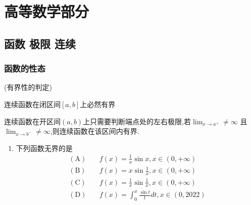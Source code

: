 \documentclass[12pt, a4paper, oneside, UTF8]{ctexbook}
\begin{document}

\else
\fi

\chapter{高等数学部分}

\section{函数 极限 连续}
\subsection{函数的性态}
\begin{remark}(有界性的判定)
    \item 连续函数在闭区间$[a,b]$上必然有界 

    \item 连续函数在开区间$(a,b)$上只需要判断端点处的左右极限,若$\lim_{x\to a^{+}}\neq \infty$ 且
    $\lim_{x\to b^{-}}\neq \infty$,则连续函数在该区间内有界.
\end{remark}

\begin{enumerate}[label=\arabic*.]
    \item  下列函数无界的是
    \begin{align*}
        (\text{A})&\quad f(x)=\frac{1}{x}\sin x, x\in(0,+\infty) \\
        (\text{B})&\quad f(x)=x\sin\frac{1}{x}, x\in(0,+\infty) \\
        (\text{C})&\quad f(x)=\frac{1}{x}\sin\frac{1}{x}, x\in(0,+\infty) \\
        (\text{D})&\quad f(x)=\int_0^x\frac{\sin t}{t} dt, x\in(0,2022)
    \end{align*}
    
\end{enumerate}
\end{document}
